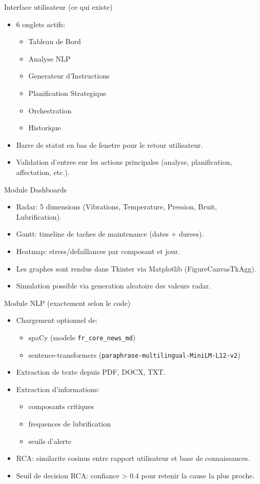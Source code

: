 \documentclass[10pt]{beamer}
\begin{document}
\begin{frame}{Interface utilisateur (ce qui existe)}
\begin{itemize}
\item 6 onglets actifs:
\begin{itemize}
\item Tableau de Bord
\item Analyse NLP
\item Generateur d'Instructions
\item Planification Strategique
\item Orchestration
\item Historique
\end{itemize}
\item Barre de statut en bas de fenetre pour le retour utilisateur.
\item Validation d'entree sur les actions principales (analyse, planification, affectation, etc.).
\end{itemize}
\end{frame}

\begin{frame}{Module Dashboards}
\begin{itemize}
\item Radar: 5 dimensions (Vibrations, Temperature, Pression, Bruit, Lubrification).
\item Gantt: timeline de taches de maintenance (dates + durees).
\item Heatmap: stress/defaillances par composant et jour.
\item Les graphes sont rendus dans Tkinter via Matplotlib (FigureCanvasTkAgg).
\item Simulation possible via generation aleatoire des valeurs radar.
\end{itemize}
\end{frame}

\begin{frame}{Module NLP (exactement selon le code)}
\begin{itemize}
\item Chargement optionnel de:
\begin{itemize}
\item spaCy (modele \texttt{fr\_core\_news\_md})
\item sentence-transformers (\texttt{paraphrase-multilingual-MiniLM-L12-v2})
\end{itemize}
\item Extraction de texte depuis PDF, DOCX, TXT.
\item Extraction d'informations:
\begin{itemize}
\item composants critiques
\item frequences de lubrification
\item seuils d'alerte
\end{itemize}
\item RCA: similarite cosinus entre rapport utilisateur et base de connaissances.
\item Seuil de decision RCA: confiance > 0.4 pour retenir la cause la plus proche.
\end{itemize}
\end{frame}
\end{document}
